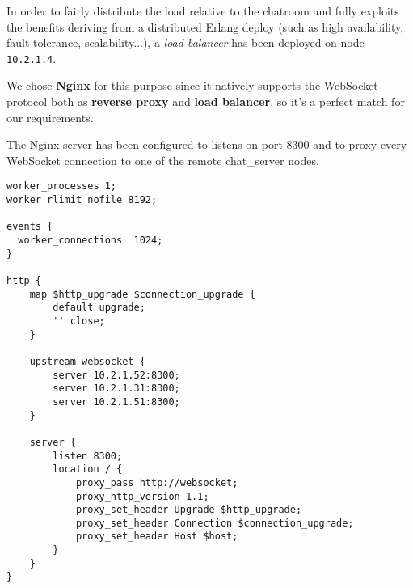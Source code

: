 In order to fairly distribute the load relative to the chatroom and fully exploits the benefits deriving from a distributed Erlang deploy (such as high availability, fault tolerance, scalability...), a \textit{load balancer} has been deployed on node \texttt{10.2.1.4}.

We chose \textbf{Nginx} for this purpose since it natively supports the WebSocket protocol both as \textbf{reverse proxy} and \textbf{load balancer}, so it's a perfect match for our requirements.

The Nginx server has been configured to listens on port 8300 and to proxy every WebSocket connection to one of the remote chat\_server nodes.

\begin{verbatim}
worker_processes 1;
worker_rlimit_nofile 8192;

events {
  worker_connections  1024;
}

http {
    map $http_upgrade $connection_upgrade {
        default upgrade;
        '' close;
    }
	
    upstream websocket {
        server 10.2.1.52:8300;
        server 10.2.1.31:8300;
        server 10.2.1.51:8300;
    }
	
    server {
        listen 8300;
        location / {
            proxy_pass http://websocket;
            proxy_http_version 1.1;
            proxy_set_header Upgrade $http_upgrade;
            proxy_set_header Connection $connection_upgrade;
            proxy_set_header Host $host;
        }
    }
}
\end{verbatim}

